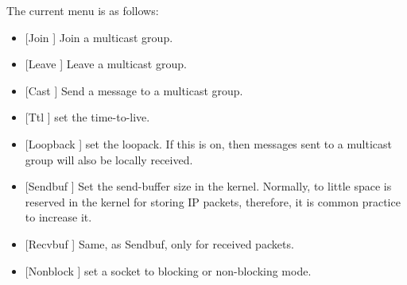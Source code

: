 The current menu is as follows:
\begin{itemize}
\item
{[Join  ]} Join a multicast group.
\item 
{[Leave  ]} Leave a multicast group.
\item 
{[Cast  ]} Send a message to a multicast
group.
\item 
{[Ttl  ]} set the time-to-live.
\item 
{[Loopback  ]} set the loopack. If this is on, then
messages sent to a multicast group will also be locally received.
\item 
{[Sendbuf  ]} Set the send-buffer size in the kernel.
Normally, to little space is reserved in the kernel for storing IP
packets, therefore, it is common practice to increase it.
\item 
{[Recvbuf ]} 
Same, as Sendbuf, only for received packets.
\item 
{[Nonblock  ]} set a socket to blocking or non-blocking
mode.
\end{itemize}



